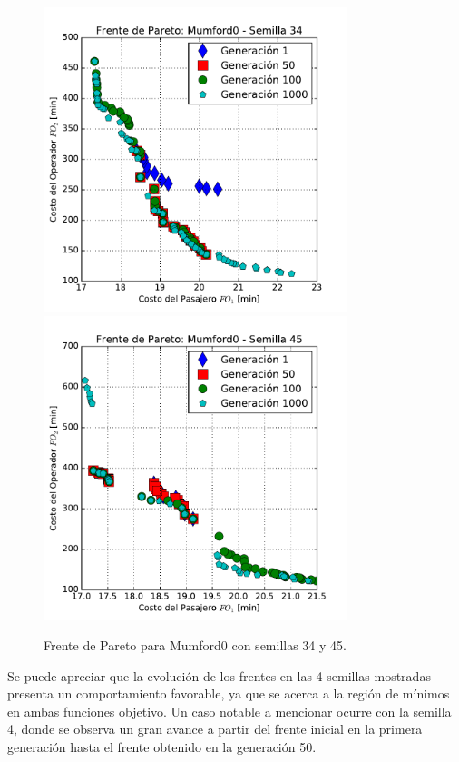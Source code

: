 \begin{figure}[p]
\centering
\includegraphics[width=0.79\textwidth]{img/frente_Mumford0_s34}
\includegraphics[width=0.79\textwidth]{img/frente_Mumford0_s45}
\caption{Frente de Pareto para Mumford0 con semillas 34 y 45.}
\label{fig:paretoMumford2}
\end{figure}

Se puede apreciar que la evolución de los frentes en las 4 semillas mostradas presenta un comportamiento favorable, ya que se acerca a la región de mínimos en ambas funciones objetivo. Un caso notable a mencionar ocurre con la semilla 4, donde se observa un gran avance a partir del frente inicial en la primera generación hasta el frente obtenido en la generación 50.



